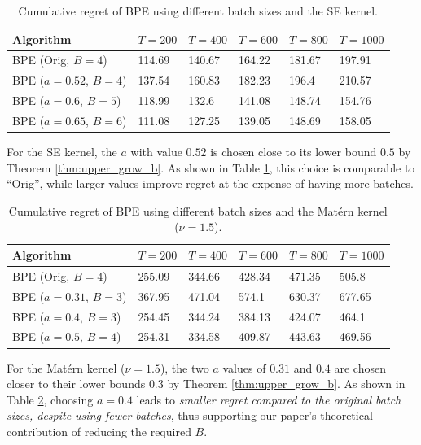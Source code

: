 \documentclass[10pt]{article}
\begin{document}
\begin{table}[ht]
\caption{Cumulative regret of BPE using different batch sizes and the SE kernel.} \label{tab:se}
\begin{center}
\begin{tabular}{llllll}
\toprule
Algorithm  & $T=200$ & $T=400$ & $T=600$ & $T=800$ & $T=1000$ \\
\midrule
BPE (Orig, $B=4$)       & 114.69 & 140.67 & 164.22 & 181.67 & 197.91 \\
BPE ($a=0.52$, $B=4$)   & 137.54 & 160.83 & 182.23 & 196.4  & 210.57 \\
BPE ($a=0.6$, $B=5$)    & 118.99 & 132.6  & 141.08 & 148.74 & 154.76 \\
BPE ($a=0.65$, $B=6$)   & 111.08 & 127.25 & 139.05 & 148.69 & 158.05 \\
\bottomrule
\end{tabular}
\end{center}
\end{table}

For the SE kernel, the $a$ with value $0.52$ is chosen close to its lower bound $0.5$ by Theorem \ref{thm:upper_grow_b}. As shown in Table \ref{tab:se}, this choice is comparable to “Orig”, while larger values improve regret at the expense of having more batches.

\begin{table}[h!]
\caption{Cumulative regret of BPE using different batch sizes and the Mat\'ern kernel ($\nu=1.5$).} \label{tab:mat_1.5}
\begin{center}
\begin{tabular}{llllll}
\toprule
Algorithm  & $T=200$ & $T=400$ & $T=600$ & $T=800$ & $T=1000$ \\
\midrule
BPE (Orig, $B=4$)     & 255.09 & 344.66 & 428.34 & 471.35 & 505.8  \\
BPE ($a=0.31$, $B=3$) & 367.95 & 471.04 & 574.1  & 630.37 & 677.65 \\
BPE ($a=0.4$, $B=3$)  & 254.45 & 344.24 & 384.13 & 424.07 & 464.1  \\
BPE ($a=0.5$, $B=4$)  & 254.31 & 334.58 & 409.87 & 443.63 & 469.56 \\
\bottomrule
\end{tabular}
\end{center}
\end{table}

For the Mat\'ern kernel ($\nu=1.5$), the two $a$ values of $0.31$ and $0.4$ are chosen closer to their lower bounds $0.3$ by Theorem \ref{thm:upper_grow_b}. As shown in Table \ref{tab:mat_1.5}, choosing $a=0.4$ leads to \emph{smaller regret compared to the original batch sizes, despite using fewer batches}, thus supporting our paper’s theoretical contribution of reducing the required $B$.
\end{document}
